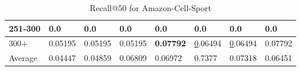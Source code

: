 \begin{table*}[]
\begin{tabular}{|l|l|l|l|l|l|l||l|}
        251-300   & 0.0                            & 0.0                            & 0.0                            & 0.0                            & 0.0                            & 0.0                             & 0.0                        \\ \hline
        300+      & 0.05195                        & 0.05195                        & 0.05195                        & \textbf{0.07792}               & {\ul 0.06494}                  & {\ul 0.06494}                   & 0.07792                    \\ \hline
        Average   & 0.04447                        & 0.04859                        & 0.06809                        & 0.06972                        & 0.7377                         & 0.07318                         & 0.06451                    \\ \hline
    \end{tabular}
    \caption{Recall@50 for Amazon-Cell-Sport}
    \label{tab:Amazon-Cell-Sport-recall-evaluation}
\end{table*}